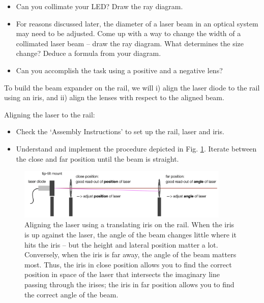 \documentclass[a4paper]{report}
\begin{document}
    \begin{itemize}
        \item Can you collimate your LED? Draw the ray diagram.
		\item For reasons discussed later, the diameter of a laser beam in an optical system may need to be adjusted. Come up with a way to change the width of a collimated laser beam -- draw the ray diagram. What determines the size change? Deduce a formula from your diagram. 
	    \item Can you accomplish the task using a positive and a negative lens? 
	\end{itemize}

    \noindent
	To build the beam expander on the rail, we will i) align the laser diode to the rail using an iris, and ii) align the lenses with respect to the aligned beam. 


    \noindent
	Aligning the laser to the rail:
	\begin{itemize}
	    \item Check the `Assembly Instructions' to set up the rail, laser and iris.
	    \item Understand and implement the procedure depicted in Fig. \ref{fig:laser_alignment}. Iterate between the close and far position until the beam is straight.
	\end{itemize}


	\begin{figure}[h]
		\center
		\includegraphics[width=0.9\textwidth]{figures/laser_alignment.png}
		\captionsetup{width=0.9\textwidth}
		\caption{Aligning the laser using a translating iris on the rail. When the iris is up against the laser, the angle of the beam changes little where it hits the iris -- but the height and lateral position matter a lot. Conversely, when the iris is far away, the angle of the beam matters most. Thus, the iris in close position allows you to find the correct position in space of the laser that intersects the imaginary line passing through the irises; the iris in far position allows you to find the correct angle of the beam.}
		\label{fig:laser_alignment}
	\end{figure}
	
\end{document}
